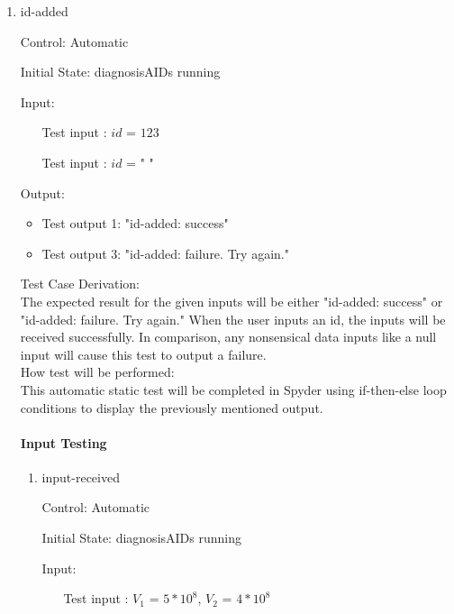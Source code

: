 \documentclass[12pt, titlepage]{article}
\newcounter{tinnum} %
\begin{document}
\begin{enumerate}

\item{id-added\\}

Control: Automatic
					
Initial State: diagnosisAIDs running

Input:

\begin{itemize}
\item[Test input \refstepcounter{tinnum}\thetinnum\label{Tinput_1}:] $id$ = 
$123$%
\item[Test input \refstepcounter{tinnum}\thetinnum\label{Tinput_2}:] $id$ = "   
"%
\end{itemize}


Output: 
\begin{itemize}
\item Test output 1: "id-added: success"
\item Test output 3: "id-added: failure. Try again."
\end{itemize}

Test Case Derivation:\\
The expected result for the given inputs will be either "id-added: success" or  
"id-added: failure. Try again." When the user inputs an id, the inputs will be 
received successfully. In comparison, any nonsensical data inputs like a null 
input will cause this test to output a failure.\\

How test will be performed: \\
This automatic static test will be completed in Spyder using if-then-else loop 
conditions to display the previously mentioned output. \\


\paragraph{Input Testing}

\begin{enumerate}

\item{input-received\\}

Control: Automatic
					
Initial State: diagnosisAIDs running
					
Input:
\begin{itemize}
\item[Test input \refstepcounter{tinnum}\thetinnum\label{Tinput_3}:]$V_1$ = $5*10^8$, $V_2$ = $4*10^8$%


\end{itemize}
\end{enumerate}
\end{enumerate}
\end{document}
